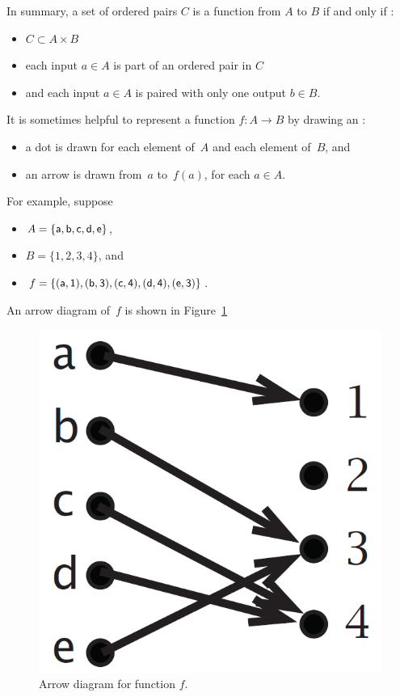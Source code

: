 In summary, a set of ordered pairs $C$ is a function from $A$ to $B$ if and only if :
\begin{itemize}
\item
$C \subset A \times B$
\item
each input $a \in A$ is part of an ordered pair in $C$
\item
and each input $a \in A$ is paired with only one output $b \in B$.
\end{itemize}

It is sometimes helpful to represent a function $f \colon A \to B$ by drawing an : 
\begin{itemize}
\item a dot is drawn for each element of~$A$ and each element of~$B$,
and
\item an arrow is drawn from~$a$ to~$f(a)$, for each $a \in A$.
\end{itemize}
For example, suppose 
\begin{itemize}
\item $A = \{\sf{a}, \sf{b}, \sf{c}, \sf{d}, \sf{e}\}$,
\item $B = \{1, 2, 3, 4\}$,
and
\item $f = \{ (\sf{a},1), (\sf{b}, 3), (\sf{c}, 4), (\sf{d},4), (\sf{e}, 3) \}$.
\end{itemize}
An arrow diagram of~$f$ is shown in Figure~\ref{fig:arrowDiag}
\begin{figure}[h]
\begin{center}
\includegraphics[scale=0.55]{images/arrowdiageg.png}
\caption{Arrow diagram for function $f$.}
\label{fig:arrowDiag}
\end{center}
\end{figure}

